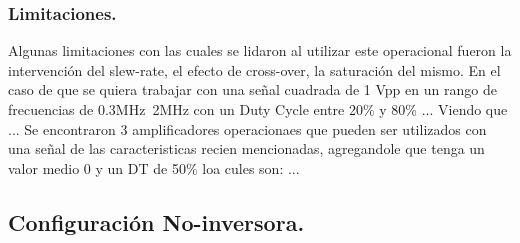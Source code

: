 \subsubsection{Limitaciones.}
Algunas limitaciones con las cuales se lidaron al utilizar este operacional fueron la intervención del slew-rate, el efecto de cross-over, la saturación del mismo.
En el caso de que se quiera trabajar con una señal cuadrada  de 1 Vpp en un rango de frecuencias de 0.3MHz~2MHz con un Duty Cycle entre 20\% y 80\% ...
Viendo que ... Se encontraron 3 amplificadores operacionaes que pueden ser utilizados con una señal de las caracteristicas recien mencionadas, agregandole que tenga un valor medio 0 y un DT de 50\% loa cules son: ...
\subsection{Configuración No-inversora.}
